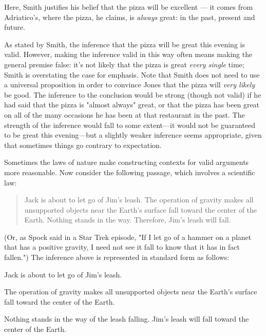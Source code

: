 Here, Smith justifies his belief that the pizza will be excellent --- it comes from Adriatico's, where the pizza, he claims, is \textit{always }great: in the past, present and future. 

As stated by Smith, the inference that the pizza will be great this evening is valid. However, making the inference valid in this way often means making the general premise false: it's not likely that the pizza is great \textit{every single }time; Smith is overstating the case for emphasis. Note that Smith does not need to use a universal proposition in order to convince Jones that the pizza will \textit{very likely} be good. The inference to the conclusion would be strong (though not valid) if he had said that the pizza is "almost always" great, or that the pizza has been great on all of the many occasions he has been at that restaurant in the past. The strength of the inference would fall to some extent---it would not be guaranteed to be great this evening---but a slightly weaker inference seems appropriate, given that sometimes things go contrary to expectation. 

Sometimes the laws of nature make constructing contexts for valid arguments more reasonable. Now consider the following passage, which involves a scientific law:

\begin{quotation}\noindent Jack is about to let go of Jim's leash. The operation of gravity makes all unsupported objects near the Earth's surface fall toward the center of the Earth. Nothing stands in the way. Therefore, Jim's leash will fall. \end{quotation}

(Or, as Spock said in a Star Trek episode, "If I let go of a hammer on a planet that has a positive gravity, I need not see it fall to know that it has in fact fallen.") The inference above is represented in standard form as follows:

\begin{adjustwidth}{2em}{2em}
\begin{earg*}
\item  Jack is about to let go of Jim's leash. 
\item  The operation of gravity makes all unsupported objects near the Earth's surface fall toward the center of the Earth. 
\item  Nothing stands in the way of the leash falling. 
\itemc  Jim's leash will fall toward the center of the Earth.
\end{earg*}
\end{adjustwidth}

